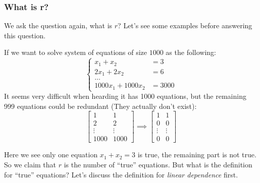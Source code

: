 \subsubsection{What is r?}
We ask the question again, what is $r$? Let's see some examples before answering this question.
\begin{example}
If we want to solve system of equations of size $1000$ as the following:
\[
\left\{\begin{aligned}
x_1+x_2&=3\\2x_1+2x_2&=6\\\dots\\1000x_1+1000x_2&=3000
\end{aligned}\right.
\]
It seems very difficult when hearding it has 1000 equations, but the remaining 999 equations could be redundant (They actually don't exist):
\[
\begin{bmatrix}
1&1\\2&2\\\vdots&\vdots\\1000&1000
\end{bmatrix}\implies
\begin{bmatrix}
1&1\\0&0\\\vdots&\vdots\\0&0
\end{bmatrix}
\]
\end{example}
Here we see only one equation $x_1+x_2=3$ is true, the remaining part is not true. So we claim that $r$ is the number of ``true'' equations. But what is the definition for ``true'' equations? Let's discuss the definition for \textit{linear dependence} first.
